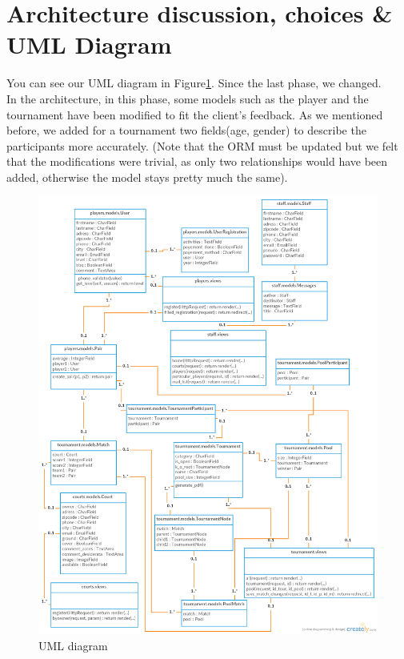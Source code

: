 \documentclass[a4paper, 12pt]{article}
\begin{document}
\newpage
\section{Architecture discussion, choices \& UML Diagram}

You can see our UML diagram in Figure\ref{uml}. Since the last phase, we changed.\\

In the architecture, in this phase, some models such as the player and the tournament have been modified to fit the client's feedback. As we mentioned before, we added for a tournament two fields(age, gender) to describe the participants more accurately. (Note that the ORM must be updated but we felt that the modifications were trivial, as only two relationships would have been added, otherwise the model stays pretty much the same). 

\begin{figure}[b]
	\caption{\label{uml} UML diagram}
\includegraphics[scale=0.45]{Class.png}
\end{figure}
\end{document}
